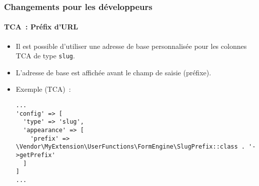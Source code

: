 
\begin{frame}[fragile]
	\frametitle{Changements pour les développeurs}
	\framesubtitle{TCA~: Préfix d'URL}

	\lstset{basicstyle=\tiny\ttfamily}

	\begin{itemize}

		\item Il est possible d'utiliser une adresse de base personnalisée pour les colonnes TCA de type \texttt{slug}.
		\item L'adresse de base est affichée avant le champ de saisie (préfixe).
		\item Exemple (TCA)~:

\vspace{-0.4cm}
\begin{lstlisting}
...
'config' => [
  'type' => 'slug',
  'appearance' => [
    'prefix' => \Vendor\MyExtension\UserFunctions\FormEngine\SlugPrefix::class . '->getPrefix'
  ]
]
...
\end{lstlisting}

	\end{itemize}

\end{frame}


